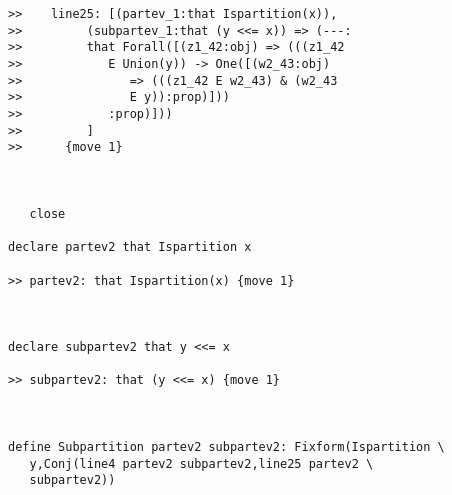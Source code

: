 \documentclass[12pt]{article}
\begin{document}
\begin{verbatim}
>>    line25: [(partev_1:that Ispartition(x)),
>>         (subpartev_1:that (y <<= x)) => (---:
>>         that Forall([(z1_42:obj) => (((z1_42
>>            E Union(y)) -> One([(w2_43:obj)
>>               => (((z1_42 E w2_43) & (w2_43
>>               E y)):prop)]))
>>            :prop)]))
>>         ]
>>      {move 1}



   close

declare partev2 that Ispartition x

>> partev2: that Ispartition(x) {move 1}



declare subpartev2 that y <<= x

>> subpartev2: that (y <<= x) {move 1}



define Subpartition partev2 subpartev2: Fixform(Ispartition \
   y,Conj(line4 partev2 subpartev2,line25 partev2 \
   subpartev2))


\end{verbatim}
\end{document}
